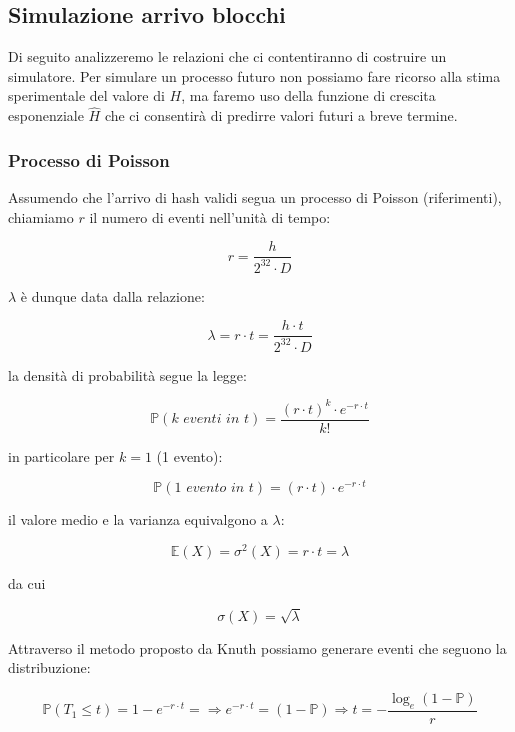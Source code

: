 \documentclass{book}
\theoremstyle{definition}
\begin{document}
\clearpage

\subsection{Simulazione arrivo blocchi}

Di seguito analizzeremo le relazioni che ci contentiranno di costruire un simulatore.
Per simulare un processo futuro non possiamo fare ricorso alla stima sperimentale del valore di $H$, 
ma faremo uso della funzione di crescita esponenziale $\hat{H}$ che ci consentirà di predirre valori futuri a breve termine.


\subsubsection{Processo di Poisson}

Assumendo che l'arrivo di hash validi segua un processo di Poisson (riferimenti), chiamiamo $r$ il numero di eventi nell'unità di tempo:

$$
r = \frac{h}{2^{32} \cdot D}
$$

$\lambda$ è dunque data dalla relazione:

\begin{equation}   
    \lambda = r \cdot t = \frac{h \cdot t}{2^{32} \cdot D}  \label{lambda_rate}
\end{equation}

la densità di probabilità segue la legge:

$$
    \mathbb{P}(\textit{k eventi in t}) = \frac{(r \cdot t)^{k} \cdot e^{-r \cdot t}}{k!}
$$

in particolare per $k = 1$ (1 evento):

\begin{equation}    
    \mathbb{P}(\textit{1 evento in t}) = (r \cdot t) \cdot e^{-r \cdot t}
\end{equation}


il valore medio e la varianza equivalgono a $\lambda$:

$$
    \mathbb{E}(X) = \sigma^{2}(X) = r \cdot t = \lambda
$$

da cui

$$
    \sigma(X) = \sqrt{\lambda} 
$$

Attraverso il metodo proposto da Knuth possiamo generare eventi che seguono la distribuzione:

$$
    \mathbb{P}(T_{1} \le t) = 1 - e^{-r \cdot t}  = \Rightarrow e^{-r \cdot t} = (1 - \mathbb{P}) \Rightarrow t = - \frac{\log_{e}(1 - \mathbb{P})}{r}
$$
\end{document}
